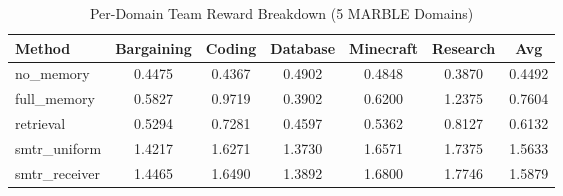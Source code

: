 \begin{table}[t]
\caption{Per-Domain Team Reward Breakdown (5 MARBLE Domains)}
\label{tab:receiver3_per_domain}
\centering
\begin{tabular}{l c c c c c c}
\toprule
Method & Bargaining & Coding & Database & Minecraft & Research & Avg \\
\midrule
no\_memory & 0.4475 & 0.4367 & 0.4902 & 0.4848 & 0.3870 & 0.4492 \\
full\_memory & 0.5827 & 0.9719 & 0.3902 & 0.6200 & 1.2375 & 0.7604 \\
retrieval & 0.5294 & 0.7281 & 0.4597 & 0.5362 & 0.8127 & 0.6132 \\
smtr\_uniform & 1.4217 & 1.6271 & 1.3730 & 1.6571 & 1.7375 & 1.5633 \\
smtr\_receiver & 1.4465 & 1.6490 & 1.3892 & 1.6800 & 1.7746 & 1.5879 \\
\bottomrule
\end{tabular}
\end{table}